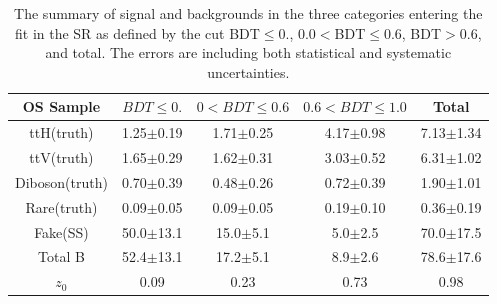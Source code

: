 \begin{table}[htbp]
\begin{center}
\begin{tabular}{|c|c|c|c|c|}\hline
OS Sample & $BDT\le0.$  & $0<BDT\le 0.6$ & $0.6<BDT\le 1.0$ & Total \\ \hline
ttH(truth) & 1.25$\pm$0.19 & 1.71$\pm$0.25 & 4.17$\pm$0.98 & 7.13$\pm$1.34 \\
ttV(truth) & 1.65$\pm$0.29 & 1.62$\pm$0.31 & 3.03$\pm$0.52  & 6.31$\pm$1.02\\
Diboson(truth) & 0.70$\pm$0.39 & 0.48$\pm$0.26 & 0.72$\pm$0.39 & 1.90$\pm$1.01\\
Rare(truth) & 0.09$\pm$0.05 & 0.09$\pm$0.05 & 0.19$\pm$0.10 & 0.36$\pm$0.19\\
Fake(SS) & 50.0$\pm$13.1 & 15.0$\pm$5.1 & 5.0$\pm$2.5 & 70.0$\pm$17.5\\
Total B & 52.4$\pm$13.1 & 17.2$\pm$5.1 & 8.9$\pm$2.6 & 78.6$\pm$17.6\\ \hline
$z_0$ & 0.09 & 0.23 & 0.73 & 0.98\\ \hline
\end{tabular}
\caption{ The summary of signal and backgrounds in the three categories entering the fit in 
the \ltwotau SR as defined by the cut BDT$\le 0.$, 0.0$<$BDT$\le$0.6, BDT$>$0.6, and 
total.  The errors are including both statistical and systematic uncertainties.
}
\label{Tab:1l2tau.summary}
\end{center}
\end{table}

